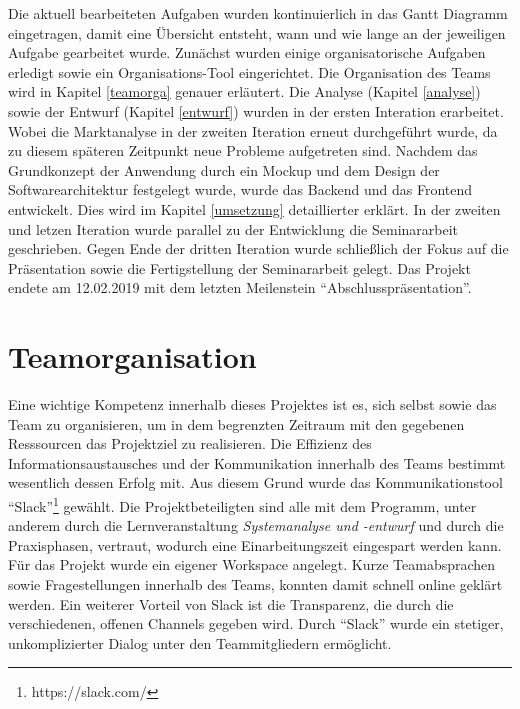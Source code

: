 	Die aktuell bearbeiteten Aufgaben wurden kontinuierlich in das Gantt Diagramm eingetragen, damit eine Übersicht entsteht, wann und wie lange an der jeweiligen Aufgabe gearbeitet wurde. Zunächst wurden einige organisatorische Aufgaben erledigt sowie ein Organisations-Tool eingerichtet. Die Organisation des Teams wird in Kapitel \vref{teamorga} genauer erläutert. Die Analyse (Kapitel \vref{analyse}) sowie der Entwurf (Kapitel \vref{entwurf}) wurden in der ersten Interation erarbeitet. Wobei die Marktanalyse in der zweiten Iteration erneut durchgeführt wurde, da zu diesem späteren Zeitpunkt neue Probleme aufgetreten sind. Nachdem das Grundkonzept der Anwendung durch ein Mockup und dem Design der Softwarearchitektur festgelegt wurde, wurde das Backend und das Frontend entwickelt. Dies wird im Kapitel \vref{umsetzung} detaillierter erklärt. In der zweiten und letzen Iteration wurde parallel zu der Entwicklung die Seminararbeit geschrieben. Gegen Ende der dritten Iteration wurde schließlich der Fokus auf die Präsentation sowie die Fertigstellung der Seminararbeit gelegt. Das Projekt endete am 12.02.2019 mit dem letzten Meilenstein \enquote{Abschlusspräsentation}.
	
	
	\section{Teamorganisation} \label{teamorga}
	Eine wichtige Kompetenz innerhalb dieses Projektes ist es, sich selbst sowie das Team zu organisieren, um in dem begrenzten Zeitraum mit den gegebenen Resssourcen das Projektziel zu realisieren. Die Effizienz des Informationsaustausches und der Kommunikation innerhalb des Teams bestimmt wesentlich dessen Erfolg mit. Aus diesem Grund wurde das Kommunikationstool \enquote{Slack}\footnote{https://slack.com/} gewählt. Die Projektbeteiligten sind alle mit dem Programm, unter anderem durch die Lernveranstaltung \textit{Systemanalyse und -entwurf} und durch die Praxisphasen, vertraut, wodurch eine Einarbeitungszeit eingespart werden kann. Für das Projekt wurde ein eigener Workspace angelegt. Kurze Teamabsprachen sowie Fragestellungen innerhalb des Teams, konnten damit schnell online geklärt werden. Ein weiterer Vorteil von Slack ist die Transparenz, die durch die verschiedenen, offenen Channels gegeben wird. Durch \enquote{Slack} wurde ein stetiger, unkomplizierter Dialog unter den Teammitgliedern ermöglicht.
	